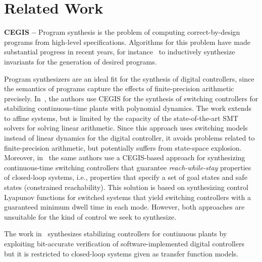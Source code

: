 \documentclass[a4paper,UKenglish]{lipics-v2018}
\begin{document}
\section{Related Work}
\label{sec:relw}

\textbf{CEGIS --}
Program synthesis is the problem of computing correct-by-design programs
from high-level specifications.  Algorithms for this problem have made
substantial progress in recent years, for instance~\cite{itzhaky2010simple}
to inductively synthesize invariants for the generation of desired programs.

Program synthesizers are an ideal fit for the synthesis of digital
controllers, since the semantics of programs capture the effects of
finite-precision arithmetic precisely. 
In~\cite{DBLP:conf/cdc/RavanbakhshS15}, the authors use CEGIS for the
synthesis of switching controllers for stabilizing continuous-time plants
with polynomial dynamics.  The work extends to affine systems, but is
limited by the capacity of the state-of-the-art SMT solvers for solving
linear arithmetic.  Since this approach uses switching models instead of
linear dynamics for the digital controller, it avoids problems related to
finite-precision arithmetic, but potentially suffers from state-space
explosion.  Moreover, in~\cite{DBLP:conf/emsoft/RavanbakhshS16} the same
authors use a CEGIS-based approach for synthesizing continuous-time
switching controllers that guarantee \emph{reach-while-stay} properties of
closed-loop systems, i.e., properties that specify a set of goal states and
safe states (constrained reachability).  This solution is based on
synthesizing control Lyapunov functions for switched systems that yield
switching controllers with a guaranteed minimum dwell time in each mode. 
However, both approaches are unsuitable for the kind of control we seek to
synthesize.

The work in~\cite{hscc-paper} synthesizes stabilizing controllers for
continuous plants by exploiting bit-accurate verification of
software-implemented digital controllers~\cite{Bessa16} but it is restricted
to closed-loop systems given as transfer function models.

\end{document}
